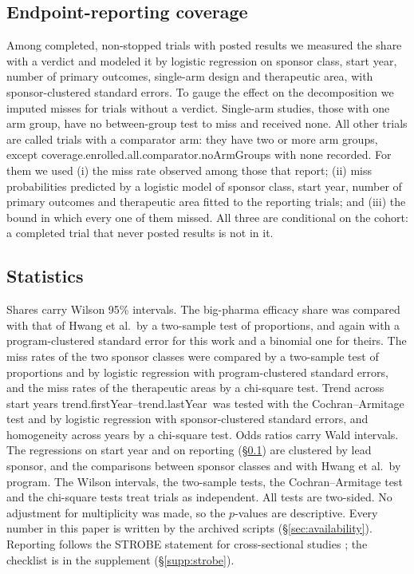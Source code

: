 \documentclass[11pt]{article}
\newcommand{\trendyears}{\num{trend.firstYear}--\num{trend.lastYear}}
\begin{document}
\subsection{Endpoint-reporting coverage}\label{sec:coverage-methods}
Among completed, non-stopped trials with posted results we measured the share with a verdict and modeled it by logistic regression on sponsor class, start year, number of primary outcomes, single-arm design and therapeutic area, with sponsor-clustered standard errors. To gauge the effect on the decomposition we imputed misses for trials without a verdict. Single-arm studies, those with one arm group, have no between-group test to miss and received none. All other trials are called trials with a comparator arm: they have two or more arm groups, except \num{coverage.enrolled.all.comparator.noArmGroups} with none recorded. For them we used (i) the miss rate observed among those that report; (ii) miss probabilities predicted by a logistic model of sponsor class, start year, number of primary outcomes and therapeutic area fitted to the reporting trials; and (iii) the bound in which every one of them missed. All three are conditional on the cohort: a completed trial that never posted results is not in it.

\subsection{Statistics}\label{sec:stats}
Shares carry Wilson 95\% intervals. The big-pharma efficacy share was compared with that of Hwang et al.\ by a two-sample test of proportions, and again with a program-clustered standard error for this work and a binomial one for theirs. The miss rates of the two sponsor classes were compared by a two-sample test of proportions and by logistic regression with program-clustered standard errors, and the miss rates of the therapeutic areas by a chi-square test. Trend across start years \trendyears\ was tested with the Cochran--Armitage test \cite{cochran1954,armitage1955} and by logistic regression with sponsor-clustered standard errors, and homogeneity across years by a chi-square test. Odds ratios carry Wald intervals. The regressions on start year and on reporting (\S\ref{sec:coverage-methods}) are clustered by lead sponsor, and the comparisons between sponsor classes and with Hwang et al.\ by program. The Wilson intervals, the two-sample tests, the Cochran--Armitage test and the chi-square tests treat trials as independent. All tests are two-sided. No adjustment for multiplicity was made, so the $p$-values are descriptive. Every number in this paper is written by the archived scripts (\S\ref{sec:availability}). Reporting follows the STROBE statement for cross-sectional studies \cite{vonelm2007}; the checklist is in the supplement (\S\ref{supp:strobe}).
\end{document}
